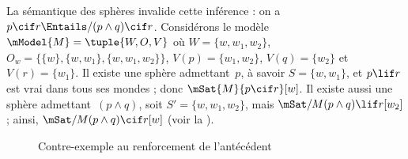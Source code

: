 \documentclass[../../../include/open-logic-section]{subfiles}
\begin{document}
\begin{ex}
  La sémantique des sphères invalide cette inférence : on a $p
  \cif r \Entails/ (p \land q) \cif r$. Considérons le modèle
  $\mModel{M} = \tuple{W, O, V}$ où $W = \{w, w_1, w_2\}$,
  $O_w = \{\{w\}, \{w, w_1\}, \{w, w_1, w_2\}\}$,
  $V(p) = \{w_1, w_2\}$, $V(q) = \{w_2\}$ et $V(r) = \{w_1\}$.
%
   Il existe une sphère
  admettant~$p$, à savoir $S = \{w, w_1\}$, et $p \lif r$ est vrai
  dans tous ses mondes ; donc $\mSat{M}{p \cif r}[w]$. Il existe
  aussi une sphère admettant~$(p \land q)$, soit
  $S' = \{w, w_1, w_2\}$, mais
  $\mSat/{M}{(p \land q) \lif r}[w_2]$ ; ainsi,
  $\mSat/{M}{(p \land q) \cif r}[w]$ (voir
  la ).

\begin{figure}
\begin{center}
\caption{Contre-exemple au renforcement de l'antécédent}
\end{center}
\end{figure}
\end{ex}
\end{document}
